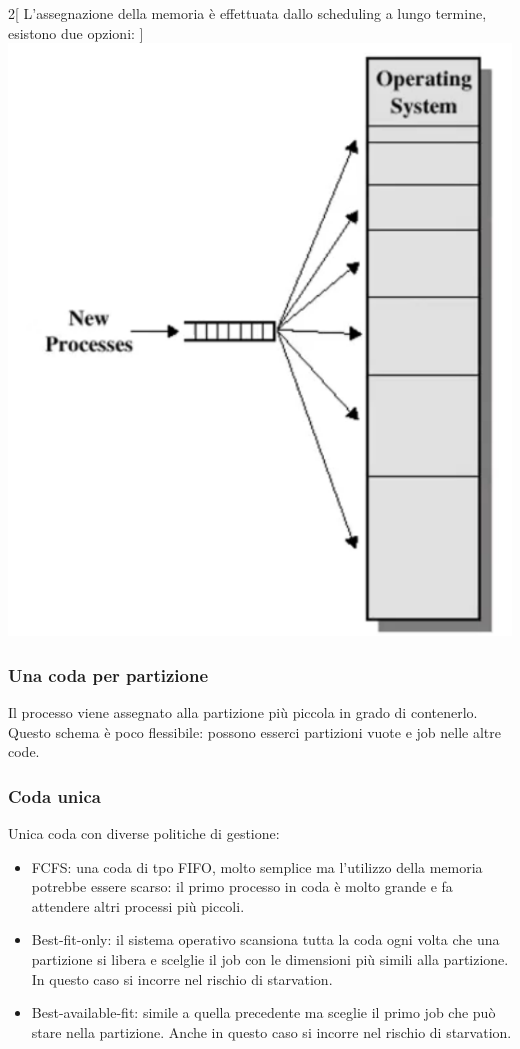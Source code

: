 \documentclass[a4paper,12pt, twoside]{report}
\begin{document}
\begin{multicols}{2}[
L'assegnazione della memoria \`e effettuata dallo scheduling a lungo termine, esistono due 
opzioni: ]
    \includegraphics[scale=0.2]{singleQueue}
\end{multicols}

\subsubsection{Una coda per partizione}
Il processo viene assegnato alla partizione pi\`u piccola in grado di contenerlo. Questo
schema \`e poco flessibile: possono esserci partizioni vuote e job nelle altre code.

\subsubsection{Coda unica}
Unica coda con diverse politiche di gestione:
\begin{itemize}
    \item FCFS: una coda di tpo FIFO, molto semplice ma l'utilizzo della memoria potrebbe 
        essere scarso: il primo processo in coda \`e molto grande e fa attendere altri 
        processi pi\`u piccoli. 
    \item Best-fit-only: il sistema operativo scansiona tutta la coda ogni volta che una 
        partizione si libera e scelglie il job con le dimensioni pi\`u simili alla partizione.
        In questo caso si incorre nel rischio di starvation.
    \item Best-available-fit: simile a quella precedente ma sceglie il primo job che pu\`o 
        stare nella partizione. Anche in questo caso si incorre nel rischio di starvation. 
\end{itemize}
\end{document}
